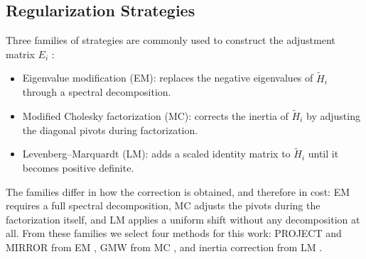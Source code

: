 \documentclass[class=scrbook, crop=false]{standalone}
\begin{document}
\subsection{Regularization Strategies}
\label{subsec:reg_strategies}
Three families of strategies are commonly used to construct the adjustment matrix $E_i$
\cite{nocedal2006numerical, mcsweeneyModifiedCholeskyDecomposition2017, More1978levenberg}:
\begin{itemize}
    \item Eigenvalue modification (EM): replaces the negative eigenvalues of $\tilde{H}_i$ through a spectral decomposition.
    \item Modified Cholesky factorization (MC): corrects the inertia of $\tilde{H}_i$ by adjusting the diagonal pivots during factorization.
    \item Levenberg--Marquardt (LM): adds a scaled identity matrix to $\tilde{H}_i$ until it becomes positive definite.
\end{itemize}
The families differ in how the correction is obtained, and therefore in cost:
EM requires a full spectral decomposition, MC adjusts the pivots during the factorization itself,
and LM applies a uniform shift without any decomposition at all.
From these families we select four methods for this work:
PROJECT and MIRROR from EM \cite{verschueren2017sparsity},
GMW from MC \cite{gill1981practical},
and inertia correction from LM \cite{wachter2006implementation}.
\end{document}

